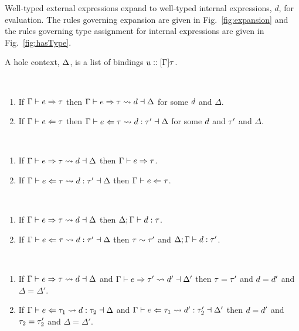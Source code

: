 


Well-typed external expressions expand to well-typed internal expressions, $d$, for evaluation. The rules governing expansion are given in Fig.~\ref{fig:expansion} and the rules governing type assignment for internal expressions are given in Fig.~\ref{fig:hasType}. 

A hole context, $\Delta$, is a list of bindings $u :: [\Gamma]\tau$.

\begin{theorem}[Expandability] ~
  \begin{enumerate}
    \item
      If $\Gamma \vdash e \Rightarrow \tau$
      then $\Gamma \vdash e \Rightarrow \tau \leadsto d \dashv \Delta$
      for some $d$ and $\Delta$.
    \item
      If $\Gamma \vdash e \Leftarrow \tau$
      then $\Gamma \vdash e \Leftarrow \tau \leadsto d : \tau' \dashv \Delta$
      for some $d$ and $\tau'$ and $\Delta$.
  \end{enumerate}
\end{theorem}

\begin{theorem}[Correspondence] ~
  \begin{enumerate}
    \item
      If $\Gamma \vdash e \Rightarrow \tau \leadsto d \dashv \Delta$
      then $\Gamma \vdash e \Rightarrow \tau$.
    \item
      If $\Gamma \vdash e \Leftarrow \tau \leadsto d : \tau' \dashv \Delta$
      then $\Gamma \vdash e \Leftarrow \tau$.
  \end{enumerate}
\end{theorem}

\begin{theorem} ~
  \begin{enumerate}
    \item
      If $\Gamma \vdash e \Rightarrow \tau \leadsto d \dashv \Delta$
      then $\Delta; \Gamma \vdash d : \tau$.
    \item
      If $\Gamma \vdash e \Leftarrow \tau \leadsto d : \tau' \dashv \Delta$
      then $\tau \sim \tau'$ and $\Delta; \Gamma \vdash d : \tau'$.
  \end{enumerate}
\end{theorem}

\begin{theorem} ~
  \begin{enumerate}
    \item
      If $\Gamma \vdash e \Rightarrow \tau \leadsto d \dashv \Delta$
      and $\Gamma \vdash e \Rightarrow \tau' \leadsto d' \dashv \Delta'$
      then $\tau=\tau'$ and $d=d'$ and $\Delta=\Delta'$.
    \item
      If $\Gamma \vdash e \Leftarrow \tau_1 \leadsto d : \tau_2 \dashv \Delta$
      and $\Gamma \vdash e \Leftarrow \tau_1 \leadsto d' : \tau_2' \dashv \Delta'$
      then $d=d'$ and $\tau_2=\tau_2'$ and $\Delta=\Delta'$.
  \end{enumerate}
\end{theorem}


